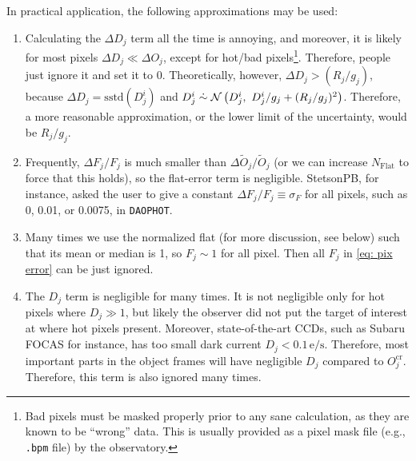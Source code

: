 In practical application, the following approximations may be used:
\begin{enumerate}
\item Calculating the $ \Delta D_j $ term all the time is annoying, and moreover, it is likely for most pixels $ \Delta D_j \ll \Delta O_j $, except for hot/bad pixels\footnote{Bad pixels must be masked properly prior to any sane calculation, as they are known to be ``wrong'' data. This is usually provided as a pixel mask file (e.g., \texttt{.bpm} file) by the observatory.}. Therefore, people just ignore it and set it to 0.  Theoretically, however, $ \Delta D_j > (R_j/g_j) $, because $\Delta D_j = \mathrm{sstd} (D_j^{i}) $ and $ D_j^{i} \mathrel{\dot{\sim}} \mathcal{N} \left (D_j^{i},~ D_j^{i}/g_j + (R_j/g_j)^2 \right ) $. Therefore, a more reasonable approximation, or the lower limit of the uncertainty, would be $ R_j/g_j $. 
\item Frequently, $ \Delta F_j/F_j $ is much smaller than $ \Delta \tilde{O}_j/\tilde{O}_j $ (or we can increase $ N_\mathrm{Flat} $ to force that this holds), so the flat-error term is negligible. StetsonPB, for instance, asked the user to give a constant $ \Delta F_j/F_j \equiv \sigma_F $ for all pixels, such as 0, 0.01, or 0.0075, in \texttt{DAOPHOT}.
\item Many times we use the normalized flat (for more discussion, see below) such that its mean or median is 1, so $ F_j \sim 1 $ for all pixel. Then all $ F_j $ in \cref{eq: pix error} can be just ignored.
\item The $ D_j $ term is negligible for many times. It is not negligible only for hot pixels where $ D_j \gg 1 $, but likely the observer did not put the target of interest at where hot pixels present. Moreover, state-of-the-art CCDs, such as Subaru FOCAS for instance, has too small dark current $ D_j < 0.1 \,\mathrm{e/s} $. Therefore, most important parts in the object frames will have negligible $ D_j $ compared to $ O_j^\mathrm{cr} $. Therefore, this term is also ignored many times.
\end{enumerate}

